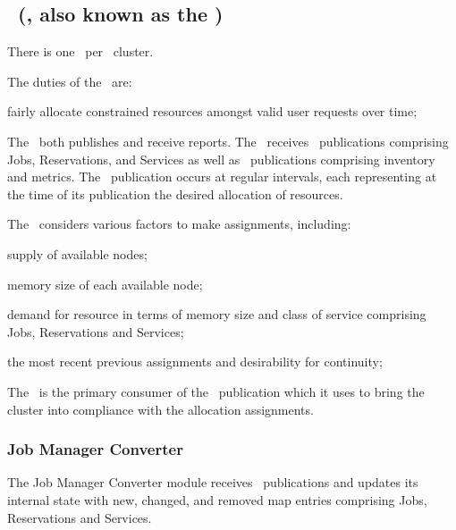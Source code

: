 \begin{itemize}
    \subsection{\varResourceManager~(\varRM, also known as the \varScheduler)}    
        
    There is one \varResourceManager~per \varDUCC~cluster.
    
    The duties of the \varResourceManager~are:
    
    \begin{description}
      \item fairly allocate constrained resources amongst valid user requests over time;
    \end{description}
    
    The \varResourceManager~both publishes and receive reports.  
    The \varResourceManager~receives \varOrchestrator~publications comprising
    Jobs, Reservations, and Services as well as 
    \varAgent~publications comprising inventory and metrics. 
    The \varResourceManager~publication occurs at regular intervals, each
    representing at the time of its publication the desired allocation
    of resources. 
   
    The \varResourceManager~considers various factors to make assignments, including:
    \begin{description}
      \item supply of available nodes;
      \item memory size of each available node;
      \item demand for resource in terms of memory size and class of service comprising Jobs, Reservations and Services;
      \item the most recent previous assignments and desirability for continuity;
    \end{description}
    
    The \varOrchestrator~is the primary consumer of the \varResourceManager~publication
    which it uses to bring the cluster into compliance with the allocation assignments.
    
    \subsubsection{Job Manager Converter} 
    
    The Job Manager Converter module receives \varOrchestrator~publications and
    updates its internal state with new, changed, and removed map entries
    comprising Jobs, Reservations and Services.
        

\end{itemize}
